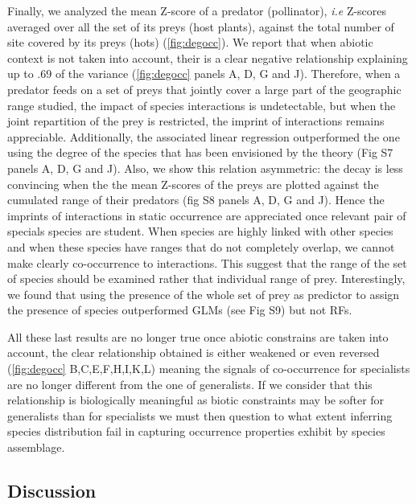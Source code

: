 Finally, we analyzed the mean Z-score of a predator (pollinator),
\emph{i.e} Z-scores averaged over all the set of its preys (host
plants), against the total number of site covered by its preys (hots)
(\ref{fig:degocc}). We report that when abiotic context is not taken
into account, their is a clear negative relationship explaining up to
.69 of the variance (\ref{fig:degocc} panels A, D, G and J). Therefore,
when a predator feeds on a set of preys that jointly cover a large part
of the geographic range studied, the impact of species interactions is
undetectable, but when the joint repartition of the prey is restricted,
the imprint of interactions remains appreciable. Additionally, the
associated linear regression outperformed the one using the degree of
the species that has been envisioned by the theory (Fig S7 panels A, D,
G and J). Also, we show this relation asymmetric: the decay is less
convincing when the the mean Z-scores of the preys are plotted against
the cumulated range of their predators (fig S8 panels A, D, G and J).
Hence the imprints of interactions in static occurrence are appreciated
once relevant pair of specials species are student. When species are
highly linked with other species and when these species have ranges that
do not completely overlap, we cannot make clearly co-occurrence to
interactions. This suggest that the range of the set of species should
be examined rather that individual range of prey. Interestingly, we
found that using the presence of the whole set of prey as predictor to
assign the presence of species outperformed GLMs (see Fig S9) but not
RFs.

All these last results are no longer true once abiotic constrains are
taken into account, the clear relationship obtained is either weakened
or even reversed (\ref{fig:degocc} B,C,E,F,H,I,K,L) meaning the signals
of co-occurrence for specialists are no longer different from the one of
generalists. If we consider that this relationship is biologically
meaningful as biotic constraints may be softer for generalists than for
specialists we must then question to what extent inferring species
distribution fail in capturing occurrence properties exhibit by species
assemblage.

\subsection{Discussion}\label{discussion}


